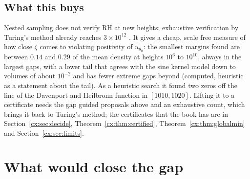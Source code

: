 \subsection{What this buys}

Nested sampling does not verify RH at new heights; exhaustive verification by Turing's method already reaches $3\times10^{12}$ \cite{PT21}. It gives a cheap, scale free measure of how close $\zeta$ comes to violating positivity of $u_{\theta_0}$: the smallest margins found are between $0.14$ and $0.29$ of the mean density at heights $10^6$ to $10^{10}$, always in the largest gaps, with a lower tail that agrees with the sine kernel model down to volumes of about $10^{-2}$ and has fewer extreme gaps beyond (computed, heuristic as a statement about the tail). As a heuristic search it found two zeros off the line of the Davenport and Heilbronn function in $[1010,1020]$. Lifting it to a certificate needs the gap guided proposals above and an exhaustive count, which brings it back to Turing's method; the certificates that the book has are in Section~\ref{cx:sec:decide}, Theorem~\ref{cx:thm:certified}, Theorem~\ref{cx:thm:globalmin} and Section~\ref{cx:sec:limits}.

\section{What would close the gap}\label{cf:sec:gap}

